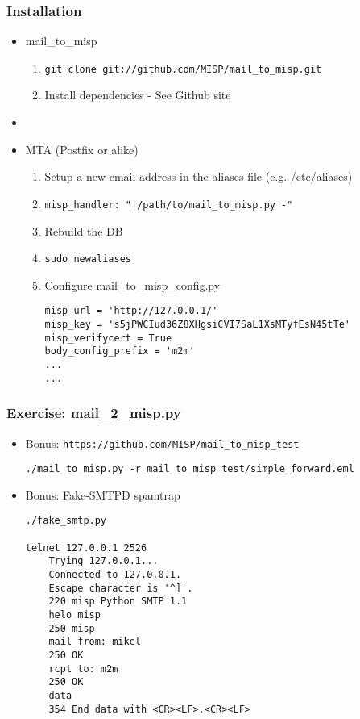 \begin{frame}[fragile]
    \frametitle{Installation}
    \begin{itemize}
        \item mail\_to\_misp
        \begin{enumerate}
            \item \texttt{git clone git://github.com/MISP/mail\_to\_misp.git}
            \item Install dependencies - See Github site
        \end{enumerate}
        \item[]
        \item MTA (Postfix or alike)
        \begin{enumerate}
            \item Setup a new email address in the aliases file (e.g. /etc/aliases)
            \item[] \texttt{misp\_handler: "|/path/to/mail\_to\_misp.py -"}
            \item Rebuild the DB
            \item[] \texttt{sudo newaliases}
            \item Configure mail\_to\_misp\_config.py
\begin{lstlisting}[basicstyle=\tiny]
misp_url = 'http://127.0.0.1/'
misp_key = 's5jPWCIud36Z8XHgsiCVI7SaL1XsMTyfEsN45tTe'
misp_verifycert = True
body_config_prefix = 'm2m'
...
...
\end{lstlisting}
        \end{enumerate}
    \end{itemize}
\end{frame}

\begin{frame}[fragile]
    \frametitle{Exercise: mail\_2\_misp.py}
    \begin{itemize}
        \item Bonus: \texttt{https://github.com/MISP/mail\_to\_misp\_test}
\begin{lstlisting}[basicstyle=\tiny]
./mail_to_misp.py -r mail_to_misp_test/simple_forward.eml
\end{lstlisting}
        \item Bonus: Fake-SMTPD spamtrap
\begin{lstlisting}[basicstyle=\tiny]
./fake_smtp.py

telnet 127.0.0.1 2526
    Trying 127.0.0.1...
    Connected to 127.0.0.1.
    Escape character is '^]'.
    220 misp Python SMTP 1.1
    helo misp
    250 misp
    mail from: mikel
    250 OK
    rcpt to: m2m
    250 OK
    data
    354 End data with <CR><LF>.<CR><LF>

\end{lstlisting}
    \end{itemize}
\end{frame}



